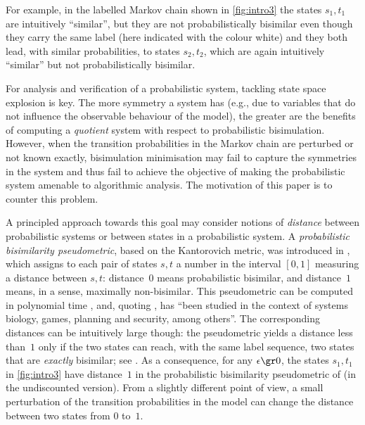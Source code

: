 For example, in the labelled Markov chain shown in \cref{fig:intro3} the states $s_1, t_1$ are intuitively ``similar'', but they are not probabilistically bisimilar even though they carry the same label (here indicated with the colour white) and they both lead, with similar probabilities, to states $s_2, t_2$, which are again intuitively ``similar'' but not probabilistically bisimilar.

For analysis and verification of a probabilistic system, tackling state space explosion is key.
The more symmetry a system has (e.g., due to variables that do not influence the observable behaviour of the model), the greater are the benefits of computing a \emph{quotient} system with respect to probabilistic bisimulation.
However, when the transition probabilities in the Markov chain are perturbed or not known exactly, bisimulation minimisation may fail to capture the symmetries in the system and thus fail to achieve the objective of making the probabilistic system amenable to algorithmic analysis.
The motivation of this paper is to counter this problem.

A principled approach towards this goal may consider notions of \emph{distance} between probabilistic systems or between states in a probabilistic system.
A \emph{probabilistic bisimilarity pseudometric}, based on the Kantorovich metric, was introduced in \cite{DGJP1999,DesharnaisGJP04}, which assigns to each pair of states $s,t$ a number in the interval $[0,1]$ measuring a distance between $s,t$: distance~$0$ means probabilistic bisimilar, and distance~$1$ means, in a sense, maximally non-bisimilar.
This pseudometric can be computed in polynomial time \cite{ChenBW12}, and, quoting \cite{ChenBW12}, has ``been studied in the context of systems biology, games, planning and security, among others''.
The corresponding distances can be intuitively large though: the pseudometric yields a distance less than~$1$ only if the two states can reach, with the same label sequence, two states that are \emph{exactly} bisimilar; see \cite[Section~4]{TangVanBreugel2018}.
As a consequence, for any $\epsilon \gr 0$, the states $s_1, t_1$ in \cref{fig:intro3} have distance~$1$ in the probabilistic bisimilarity pseudometric of \cite{DesharnaisGJP04} (in the undiscounted version).
From a slightly different point of view, a small perturbation of the transition probabilities in the model can change the distance between two states from $0$ to~$1$.

